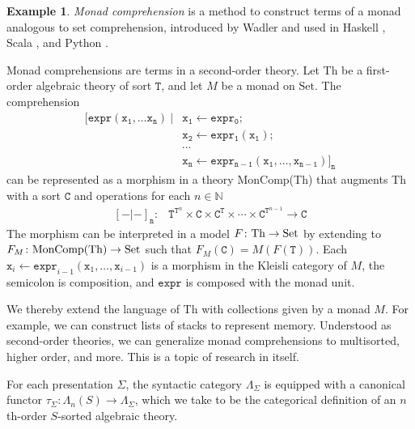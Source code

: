 \documentclass[12pt]{article}
\theoremstyle{definition}
\newtheorem{example}[theorem]{Example}
\newcommand{\mbb}[1]{\mathbb{#1}}
\newcommand{\mrm}[1]{\mathrm{#1}}
\newcommand{\mtt}[1]{\mathtt{#1}}
\newcommand{\Set}{\mrm{Set}}
\newcommand{\ttC}{\mtt{C}}
\newcommand{\ttt}{\mtt{T}}
\begin{document}
\begin{example}
    \textit{Monad comprehension} is a method to construct terms of a monad analogous to set comprehension, introduced by Wadler \cite{WadlerComprehendingMonads}and used in Haskell \cite{HaskellDo},
    Scala \cite{ScalaFor}, and Python \cite{PythonList}.
    
    Monad comprehensions are terms in a second-order theory. Let Th be a first-order algebraic theory of sort $\ttt$, and let $M$ be a monad on $\Set$. The comprehension
    \[\begin{array}{rl}
    \mtt{[expr(x_1, \ldots x_n)~|}&\mtt{x_1 \leftarrow expr_0;}\\
    &\mtt{x_2 \leftarrow expr_1(x_1);}\\
    &\mtt{\cdots}\\
    &\mtt{x_n \leftarrow expr_{n-1}(x_1, \ldots, x_{n-1})]_{n}}
    \end{array}\]
    can be represented as a morphism in a theory MonComp(Th) that augments Th with a sort $\ttC$ and operations for each $n \in \mbb{N}$
    \[\begin{array}{rl}
    \mtt{[-|-]_{n}}:&\ttt^{\ttt^n} \times \ttC \times \ttC^{\ttt} \times \cdots \times \ttC^{\ttt^{n-1}} \to \ttC
    \end{array}\]
    The morphism can be interpreted in a model $F\colon {\rm Th} \to {\rm Set}$ by extending to $F_M\colon {\rm MonComp(Th)} \to {\rm Set}$ such that $F_M(\mtt{C}) = M(F(\ttt))$.  Each $\mtt{x}_i \leftarrow \mtt{expr}_{i-1}(\mtt{x}_1, \ldots, \mtt{x}_{i-1})$ is a morphism in the Kleisli category of $M$, the semicolon is composition, and $\mtt{expr}$ is composed with the monad unit.
    
    We thereby extend the language of Th with collections given by a monad $M$. For example, we can construct lists of stacks to represent memory. Understood as second-order theories, we can generalize monad comprehensions to multisorted, higher order, and more. This is a topic of research in itself.
    
\end{example}

For each presentation $\Sigma$, the syntactic category $\Lambda_\Sigma$ is equipped with a canonical functor $\tau_\Sigma:\Lambda_n(S)\to \Lambda_\Sigma$, which we take to be the categorical definition of an $n$th-order $S$-sorted algebraic theory.
\end{document}
